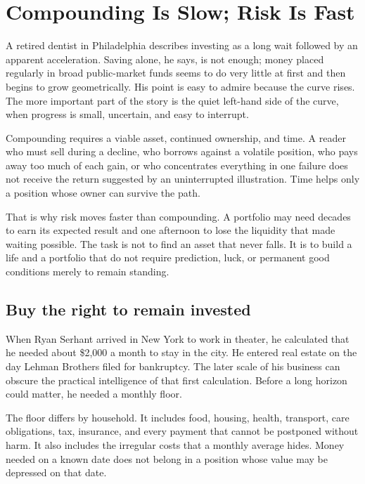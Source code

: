 \chapter{Compounding Is Slow; Risk Is Fast}

A retired dentist in Philadelphia describes investing as a long wait followed
by an apparent acceleration. Saving alone, he says, is not enough; money placed
regularly in broad public-market funds seems to do very little at first and
then begins to grow geometrically. His point is easy to admire because the
curve rises. The more important part of the story is the quiet left-hand side
of the curve, when progress is small, uncertain, and easy to interrupt.

Compounding requires a viable asset, continued ownership, and time. A reader
who must sell during a decline, who borrows against a volatile position, who
pays away too much of each gain, or who concentrates everything in one failure
does not receive the return suggested by an uninterrupted illustration. Time
helps only a position whose owner can survive the path.

That is why risk moves faster than compounding. A portfolio may need decades
to earn its expected result and one afternoon to lose the liquidity that made
waiting possible. The task is not to find an asset that never falls. It is to
build a life and a portfolio that do not require prediction, luck, or permanent
good conditions merely to remain standing.

\section{Buy the right to remain invested}

When Ryan Serhant arrived in New York to work in theater, he calculated that he
needed about \$2,000 a month to stay in the city. He entered real estate on the
day Lehman Brothers filed for bankruptcy. The later scale of his business can
obscure the practical intelligence of that first calculation. Before a long
horizon could matter, he needed a monthly floor.

The floor differs by household. It includes food, housing, health, transport,
care obligations, tax, insurance, and every payment that cannot be postponed
without harm. It also includes the irregular costs that a monthly average
hides. Money needed on a known date does not belong in a position whose value
may be depressed on that date.


